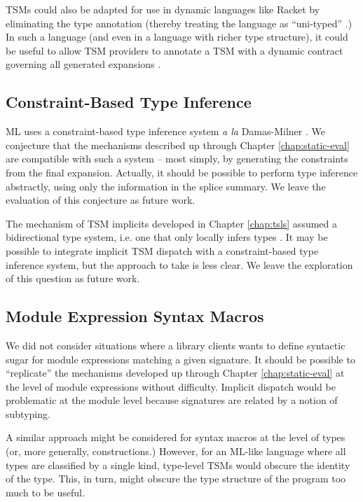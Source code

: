 TSMs could also be adapted for use in dynamic languages like Racket  by eliminating the type annotation (thereby treating the language as ``uni-typed'' \cite{scott1980lambda,pfpl}.) In such a language (and  even in a language with richer type structure), it could be useful to allow TSM providers to annotate a TSM with a dynamic contract governing all generated expansions \cite{DBLP:conf/icfp/FindlerF02}. 

\vspace{-4px}
\subsection{Constraint-Based Type Inference}\label{sec:type-inference}
ML uses a constraint-based type inference system \emph{a la} Damas-Milner \cite{damas1982principal}. We conjecture that the mechanisms described up through Chapter \ref{chap:static-eval} are compatible with such a system -- most simply, by generating the constraints from the final expansion. Actually, it should be possible to perform type inference abstractly, using only the information in the splice summary. We leave the evaluation of this conjecture as future work.

The mechanism of TSM implicits developed in Chapter \ref{chap:tsls} assumed a bidirectional type system, i.e. one that only locally infers types \cite{Pierce:2000:LTI:345099.345100}. It may be possible to integrate implicit TSM dispatch with a constraint-based type inference system, but the approach to take is less clear. We leave the exploration of this question as future work.

\vspace{-4px}
\subsection{Module Expression Syntax Macros}
We did not consider situations where a library clients wants to define syntactic sugar for  module expressions matching a given signature. It should be possible to ``replicate'' the mechanisms developed up through Chapter \ref{chap:static-eval} at the level of module expressions without difficulty. Implicit dispatch would be problematic at the module level because signatures are related by a notion of subtyping.

A similar approach might be considered for syntax macros at the level of types (or, more generally, constructions.) However, for an ML-like language where all types are classified by a single kind, type-level TSMs would obscure the identity of the type. This, in turn, might obscure the type structure of the program too much to be useful.

